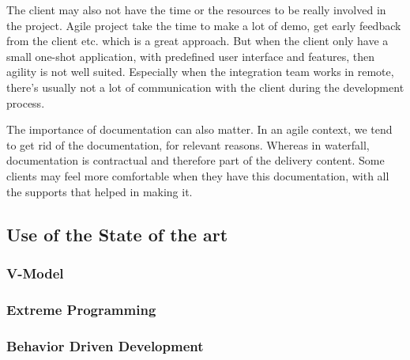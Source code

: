 The client may also not have the time or the resources to be really involved
in the project.
Agile project take the time to make a lot of demo, get early feedback from
the client etc.
which is a great approach.
But when the client only have a small one-shot application, with predefined
user interface and features, then agility is not well suited.
Especially when the integration team works in remote, there's usually not a
lot of communication with the client during the development process.

The importance of documentation can also matter.
In an agile context, we tend to get rid of the documentation, for relevant
reasons.
Whereas in waterfall, documentation is contractual and therefore part of the
delivery content.
Some clients may feel more comfortable when they have this documentation,
with all the supports that helped in making it.

\subsection{Use of the State of the art}\label{subsec:use-of-the-state-of-the-art}

\subsubsection{V-Model}

\subsubsection{Extreme Programming}

\subsubsection{Behavior Driven Development}
